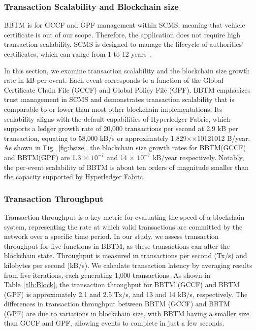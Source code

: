 \subsubsection{Transaction Scalability and Blockchain size}
BBTM is for GCCF and GPF management within SCMS, meaning that vehicle certificate is out of our scope. Therefore, the application does not require high transaction scalability. SCMS is designed to manage the lifecycle of authorities' certificates, which can range from 1 to 12 years~\cite{TimelineBenedikt}.

In this section, we examine transaction scalability and the blockchain size growth rate in kB per event. Each event corresponds to a function of the Global Certificate Chain File (GCCF) and Global Policy File (GPF). BBTM emphasizes trust management in SCMS and demonstrates transaction scalability that is comparable to or lower than most other blockchain implementations. Its scalability aligns with the default capabilities of Hyperledger Fabric, which supports a ledger growth rate of 20,000 transactions per second at 2.9 kB per transaction, equating to 58,000 kB/s or approximately 1.829××10121012 B/year. As shown in Fig.~\ref{fig:bsize}, the blockchain size growth rates for BBTM(GCCF) and BBTM(GPF) are 1.3 $\times$ $10^{-7}$ and 14 $\times$ $10^{-7}$ kB/year respectively. Notably, the per-event scalability of BBTM is about ten orders of magnitude smaller than the capacity supported by Hyperledger Fabric.

\subsubsection{Transaction Throughput}

Transaction throughput is a key metric for evaluating the speed of a blockchain system, representing the rate at which valid transactions are committed by the network over a specific time period. In our study, we assess transaction throughput for five functions in BBTM, as these transactions can alter the blockchain state. Throughput is measured in transactions per second (Tx/s) and kilobytes per second (kB/s). We calculate transaction latency by averaging results from five iterations, each generating 1,000 transactions. As shown in Table~\ref{tlb:Block}, the transaction throughput for BBTM (GCCF) and BBTM (GPF) is approximately 2.1 and 2.5 Tx/s, and 13 and 14 kB/s, respectively. The differences in transaction throughput between BBTM (GCCF) and BBTM (GPF) are due to variations in blockchain size, with BBTM having a smaller size than GCCF and GPF, allowing events to complete in just a few seconds.



